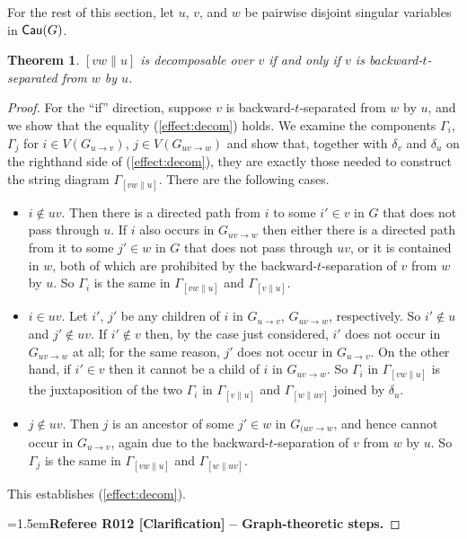 \documentclass[12pt]{amsart}
\newcommand{\RefereeRemark}[4]{%
  \par\medskip\begingroup\normalfont\small\color{RefereePurple}%
  \emergencystretch=1.5em\noindent\textbf{Referee R#1 [#2] -- #3.}\par\nobreak\noindent #4\par
  \endgroup\medskip
}
\theoremstyle{plain}
\newtheorem{thm}{Theorem}[section]
\theoremstyle{definition}
\theoremstyle{remark}
\numberwithin{equation}{section}
\theoremstyle{plain}
\newcommand{\0}{\emptyset}
\DeclareMathOperator{\cau}{\sf{Cau}}
\newcommand{\stri}{\Gamma}
\begin{document}
For the rest of this section, let $u$, $v$, and $w$ be pairwise disjoint singular variables in $\cau(G)$.

\begin{thm}\label{thm: main1}
$[vw \| u]$ is decomposable over $v$ if and only if $v$ is backward-$t$-separated from $w$ by $u$.
\end{thm}

\begin{proof}
For the ``if'' direction, suppose $v$ is backward-$t$-separated from $w$ by $u$, and we show that the equality (\ref{effect:decom}) holds. We examine the components $\stri_i$, $\stri_j$ for $i \in V(G_{u \rightarrow v})$, $j \in V(G_{uv \rightarrow w})$ and show that, together with $\delta_{v}$ and $\delta_{u}$ on the righthand side of (\ref{effect:decom}), they are exactly those needed to construct the string diagram $\stri_{[vw \| u]}$. There are the following cases.
\begin{itemize}
  \item $i \notin uv$. Then there is a directed path from $i$ to some $i' \in v$ in $G$ that does not pass through $u$. If $i$ also occurs in $G_{uv \rightarrow w}$ then either there is a directed path from it to some $j' \in w$ in $G$ that does not pass through $uv$, or it is contained in $w$, both of which are prohibited by the backward-$t$-separation of $v$ from $w$ by $u$. So  $\stri_i$ is the same in $\stri_{[vw \| u]}$ and $\stri_{[v \| u]}$.
  \item $i \in uv$. Let $i'$, $j'$ be any children of $i$ in $G_{u \rightarrow v}$, $G_{uv \rightarrow w}$, respectively. So $i' \notin u$ and $j' \notin uv$. If $i' \notin v$ then, by the case just considered, $i'$ does not occur in $G_{uv \rightarrow w}$ at all; for the same reason, $j'$ does not occur in $G_{u \rightarrow v}$. On the other hand, if $i' \in v$ then it cannot be a child  of $i$ in $G_{uv \rightarrow w}$. So $\stri_i$ in $\stri_{[vw \| u]}$ is the juxtaposition of  the two $\stri_i$ in $\stri_{[v \| u]}$ and $\stri_{[w \| uv]}$ joined by $\delta_{u}$.
  \item $j \notin uv$. Then $j$ is an ancestor of some $j' \in w$ in $G_{(uv \rightarrow w}$, and hence cannot occur in $G_{u \rightarrow v}$, again due to the backward-$t$-separation of $v$ from $w$ by $u$. So $\stri_j$ is the same in $\stri_{[vw \| u]}$ and $\stri_{[w \| uv]}$.
\end{itemize}
This establishes (\ref{effect:decom}).
\hypertarget{review-012}{}\RefereeRemark{012}{Clarification}{Graph-theoretic steps}{%
}
\end{proof}
\end{document}
